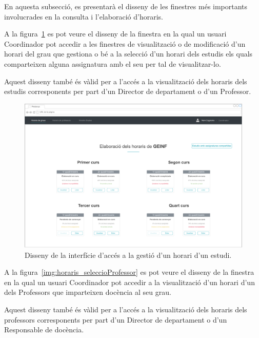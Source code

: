 \documentclass[a4paper,12pt]{ThesisStyle}
\begin{document}
En aquesta subsecció, es presentarà el disseny de les finestres més importants involucrades en la consulta i l'elaboració d'horaris.

A la figura~\ref{img:horaris_seleccioEstudi} es pot veure el disseny de la finestra en la qual un usuari Coordinador pot accedir a les finestres de visualització o de modificació d'un horari del grau que gestiona o bé a la selecció d'un horari dels estudis els quals comparteixen alguna assignatura amb el seu per tal de visualitzar-lo.

Aquest disseny també és vàlid per a l'accés a la visualització dels horaris dels estudis corresponents per part d'un Director de departament o d'un Professor.

\begin{figure}[H]
	\centering
	\includegraphics[width=\textwidth]{assets/interfaces/horaris/seleccioEstudi.pdf}
	\caption{\label{img:horaris_seleccioEstudi}Disseny de la interfície d'accés a la gestió d'un horari d'un estudi.}
\end{figure}

\newpage

A la figura~\ref{img:horaris_seleccioProfessor} es pot veure el disseny de la finestra en la qual un usuari Coordinador pot accedir a la visualització d'un horari d'un dels Professors que imparteixen docència al seu grau.

Aquest disseny també és vàlid per a l'accés a la visualització dels horaris dels professors corresponents per part d'un Director de departament o d'un Responsable de docència.
\end{document}
